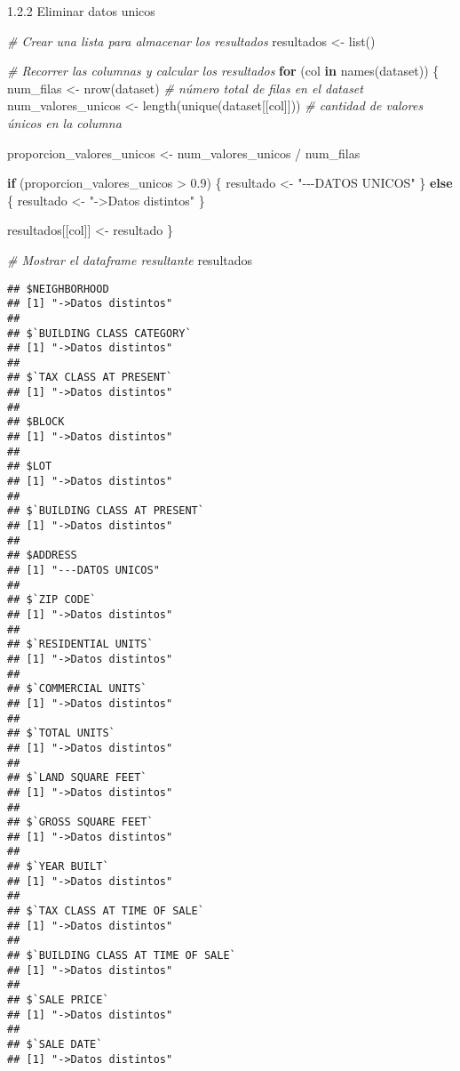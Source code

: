 \documentclass[
]{article}
\newenvironment{Shaded}{\begin{snugshade}}{\end{snugshade}}
\newcommand{\CommentTok}[1]{\textcolor[rgb]{0.56,0.35,0.01}{\textit{#1}}}
\newcommand{\ControlFlowTok}[1]{\textcolor[rgb]{0.13,0.29,0.53}{\textbf{#1}}}
\newcommand{\FloatTok}[1]{\textcolor[rgb]{0.00,0.00,0.81}{#1}}
\newcommand{\FunctionTok}[1]{\textcolor[rgb]{0.00,0.00,0.00}{#1}}
\newcommand{\NormalTok}[1]{#1}
\newcommand{\OtherTok}[1]{\textcolor[rgb]{0.56,0.35,0.01}{#1}}
\newcommand{\SpecialCharTok}[1]{\textcolor[rgb]{0.00,0.00,0.00}{#1}}
\newcommand{\StringTok}[1]{\textcolor[rgb]{0.31,0.60,0.02}{#1}}
\begin{document}
1.2.2 Eliminar datos unicos

\begin{Shaded}
\begin{Highlighting}[]
\CommentTok{\# Crear una lista para almacenar los resultados}
\NormalTok{resultados }\OtherTok{\textless{}{-}} \FunctionTok{list}\NormalTok{()}

\CommentTok{\# Recorrer las columnas y calcular los resultados}
\ControlFlowTok{for}\NormalTok{ (col }\ControlFlowTok{in} \FunctionTok{names}\NormalTok{(dataset)) \{}
\NormalTok{  num\_filas }\OtherTok{\textless{}{-}} \FunctionTok{nrow}\NormalTok{(dataset)  }\CommentTok{\# número total de filas en el dataset}
\NormalTok{  num\_valores\_unicos }\OtherTok{\textless{}{-}} \FunctionTok{length}\NormalTok{(}\FunctionTok{unique}\NormalTok{(dataset[[col]]))  }\CommentTok{\# cantidad de valores únicos en la columna}
  
\NormalTok{  proporcion\_valores\_unicos }\OtherTok{\textless{}{-}}\NormalTok{ num\_valores\_unicos }\SpecialCharTok{/}\NormalTok{ num\_filas}
  
  \ControlFlowTok{if}\NormalTok{ (proporcion\_valores\_unicos }\SpecialCharTok{\textgreater{}} \FloatTok{0.9}\NormalTok{) \{}
\NormalTok{    resultado }\OtherTok{\textless{}{-}} \StringTok{"{-}{-}{-}DATOS UNICOS"}
\NormalTok{  \} }\ControlFlowTok{else}\NormalTok{ \{}
\NormalTok{    resultado }\OtherTok{\textless{}{-}} \StringTok{"{-}\textgreater{}Datos distintos"}
\NormalTok{  \}}
  
\NormalTok{  resultados[[col]] }\OtherTok{\textless{}{-}}\NormalTok{ resultado}
\NormalTok{\}}

\CommentTok{\# Mostrar el dataframe resultante}
\NormalTok{resultados}
\end{Highlighting}
\end{Shaded}

\begin{verbatim}
## $NEIGHBORHOOD
## [1] "->Datos distintos"
## 
## $`BUILDING CLASS CATEGORY`
## [1] "->Datos distintos"
## 
## $`TAX CLASS AT PRESENT`
## [1] "->Datos distintos"
## 
## $BLOCK
## [1] "->Datos distintos"
## 
## $LOT
## [1] "->Datos distintos"
## 
## $`BUILDING CLASS AT PRESENT`
## [1] "->Datos distintos"
## 
## $ADDRESS
## [1] "---DATOS UNICOS"
## 
## $`ZIP CODE`
## [1] "->Datos distintos"
## 
## $`RESIDENTIAL UNITS`
## [1] "->Datos distintos"
## 
## $`COMMERCIAL UNITS`
## [1] "->Datos distintos"
## 
## $`TOTAL UNITS`
## [1] "->Datos distintos"
## 
## $`LAND SQUARE FEET`
## [1] "->Datos distintos"
## 
## $`GROSS SQUARE FEET`
## [1] "->Datos distintos"
## 
## $`YEAR BUILT`
## [1] "->Datos distintos"
## 
## $`TAX CLASS AT TIME OF SALE`
## [1] "->Datos distintos"
## 
## $`BUILDING CLASS AT TIME OF SALE`
## [1] "->Datos distintos"
## 
## $`SALE PRICE`
## [1] "->Datos distintos"
## 
## $`SALE DATE`
## [1] "->Datos distintos"
\end{verbatim}
\end{document}
